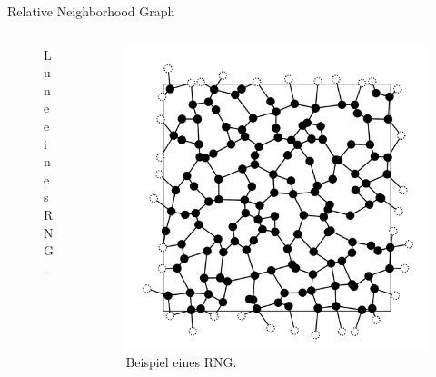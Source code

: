 \documentclass{beamer}
\begin{document}
        \begin{frame}{Relative Neighborhood Graph}
            \begin{columns}[b]
                \begin{column}{5cm}
                    \begin{figure}[htbp]
                        \centering
                        
                        \caption
                        {
                            Lune eines RNG.
                        }
                    \end{figure}
                \end{column}
                \begin{column}{5cm}
                    \begin{figure}[htbp]
                        \centering
                        \includegraphics[width=1\textwidth]{images/RNG/L12S03.pdf}
                        \caption
                        {
                            Beispiel eines RNG.
                        }
                    \end{figure}
                \end{column}
            \end{columns}
        \end{frame}
\end{document}

